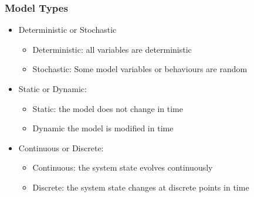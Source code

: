 \documentclass[a4paper]{article}
\begin{document}
	\subsubsection{Model Types}
	\begin{itemize}
		\item Deterministic or Stochastic
		\begin{itemize}
			\item Deterministic: all variables are deterministic
			\item Stochastic: Some model variables or behaviours are
				random
		\end{itemize}
		\item Static or Dynamic:
		\begin{itemize}
			\item Static: the model does not change in time
			\item Dynamic the model is modified in time
		\end{itemize}
		\item Continuous or Discrete:
		\begin{itemize}
			\item Continuous: the system state evolves continuously
			\item Discrete: the system state changes at discrete points in
			time
		\end{itemize}
	\end{itemize}
\end{document}
